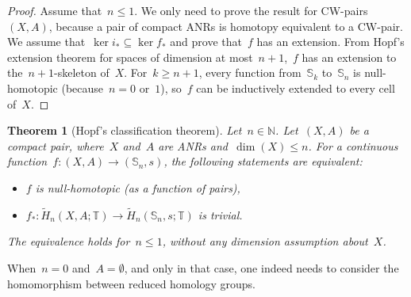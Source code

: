 \documentclass[english,11pt]{article}
\theoremstyle{plain}
\newtheorem{theorem}{Theorem}[section]
\theoremstyle{remark}
\theoremstyle{definition}
\newcommand{\Sp}{\mathbb{S}}
\newcommand{\R}{\mathbb{R}}
\newcommand{\Z}{\mathbb{Z}}
\newcommand{\N}{\mathbb{N}}
\newcommand{\RZ}{\mathbb{T}}%
\newcommand{\im}{\mathop{\mathrm{im}}}
\newcommand{\C}[1]{\mathsf{C}(#1)}%
\begin{document}
\begin{proof}
Assume that~$n\leq 1$. We only need to prove the result for CW-pairs~$(X,A)$, because a pair of compact ANRs is homotopy equivalent to a CW-pair. We assume that~$\ker i_*\subseteq\ker f_*$ and prove that~$f$ has an extension. From Hopf's extension theorem for spaces of dimension at most~$n+1$,~$f$ has an extension to the~$n+1$-skeleton of~$X$. For~$k\geq n+1$, every function from~$\Sp_k$ to~$\Sp_n$ is null-homotopic (because~$n=0$ or~$1$), so~$f$ can be inductively extended to every cell of~$X$.
\end{proof}
%
\begin{theorem}[Hopf's classification theorem]\label{thm_hopf_classification}
Let~$n\in\N$. Let~$(X,A)$ be a compact pair, where~$X$ and~$A$ are ANRs and~$\dim(X)\leq n$. For a continuous function~$f:(X,A)\to(\Sp_n,s)$, the following statements are equivalent:
\begin{itemize}
\item $f$ is null-homotopic (as a function of pairs),
\item $f_*:\widetilde{H}_n(X,A;\RZ)\to \widetilde{H}_n(\Sp_n,s;\RZ)$ is trivial.
\end{itemize}

The equivalence holds for~$n\leq 1$, without any dimension assumption about~$X$.
 \end{theorem}
When~$n=0$ and~$A=\emptyset$, and only in that case, one indeed needs to consider the homomorphism between reduced homology groups.
\end{document}
